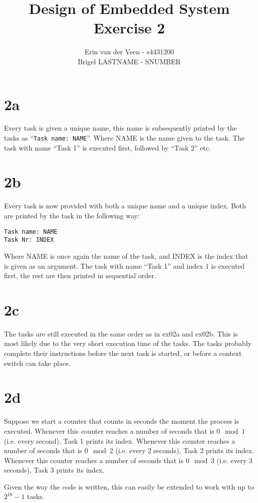 \documentclass{scrartcl}
\title{Design of Embedded System\\Exercise 2}
\author{Erin van der Veen - s4431200\\
	Brigel LASTNAME - SNUMBER}
\begin{document}
\maketitle

\section*{2a}
Every task is given a unique name, this name is subsequently printed by the tasks as ``\lstinline|Task name: NAME|''.
Where NAME is the name given to the task.
The task with name ``Task 1'' is executed first, followed by ``Task 2'' etc.

\section*{2b}
Every task is now provided with both a unique name and a unique index.
Both are printed by the task in the following way:
\begin{lstlisting}
Task name: NAME
Task Nr: INDEX
\end{lstlisting}
Where NAME is once again the name of the task, and INDEX is the index that is given as an argument.
The task with name ``Task 1'' and index 1 is executed first, the rest are then printed in sequential order.

\section*{2c}
The tasks are still executed in the same order as in ex02a and ex02b.
This is most likely due to the very short execution time of the tasks.
The tasks probably complete their instructions before the next task is started, or before a context switch can take place.

\section*{2d}
Suppose we start a counter that counts in seconds the moment the process is executed.
Whenever this counter reaches a number of seconds that is $0 \mod 1$ (i.e. every second), Task 1 prints its index.
Whenever this counter reaches a number of seconds that is $0 \mod 2$ (i.e. every 2 seconds), Task 2 prints its index.
Whenever this counter reaches a number of seconds that is $0 \mod 3$ (i.e. every 3 seconds), Task 3 prints its index.

Given the way the code is written, this can easily be extended to work with up to $2^{16} - 1$ tasks.
\end{document}
